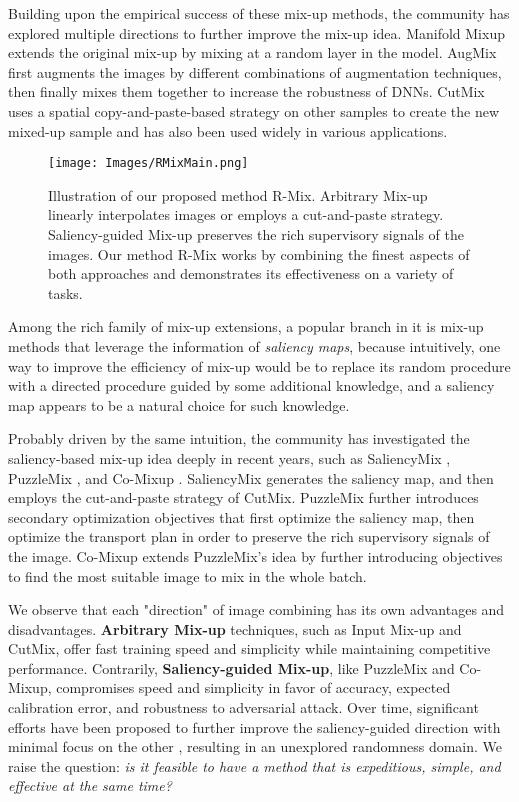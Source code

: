 \documentclass[letterpaper]{article} \usepackage[submission]{aaai23}  \usepackage{times}  \usepackage{helvet}  \usepackage{courier}  \usepackage[hyphens]{url}  \usepackage{graphicx} \urlstyle{rm} \def\UrlFont{\rm}  \usepackage{natbib}  \usepackage{caption} \frenchspacing  \setlength{\pdfpagewidth}{8.5in} \setlength{\pdfpageheight}{11in}
\newcommand{\cutmix}{{CutMix}}
\newcommand{\puzzlemix}{{PuzzleMix}}
\newcommand{\comixup}{{Co-Mixup}}
\newcommand{\manifoldmixup}{{Manifold Mixup}}
\newcommand{\saliencymix}{{SaliencyMix}}
\newcommand{\rrlmix}{{R-Mix}}
\begin{document}
Building upon the empirical success of these mix-up methods, 
the community has explored multiple directions to further 
improve the mix-up idea. \manifoldmixup{} \cite{verma2019manifold} extends the original mix-up by mixing at a random layer in the model. {AugMix} \cite{hendrycks*2020augmix} first augments the images by different combinations of augmentation techniques, then finally mixes them together to increase the robustness of DNNs. 
\cutmix{} \cite{yun2019cutmix} uses a spatial copy-and-paste-based strategy on other samples to create the new mixed-up sample
and has also been used widely in various applications.

\begin{figure}[t]
  \centering
  \texttt{[image: Images/RMixMain.png]}
  \caption{Illustration of our proposed method \rrlmix{}. Arbitrary Mix-up linearly interpolates images or employs a cut-and-paste strategy. Saliency-guided Mix-up preserves the rich supervisory signals of the images. Our method \rrlmix{} works by combining the finest aspects of both approaches and demonstrates its effectiveness on a variety of tasks.}
  \label{fig:overview}
\end{figure}

Among the rich family of mix-up extensions, 
a popular branch in it is mix-up methods 
that leverage the information of \emph{saliency maps}, 
because intuitively, 
one way to improve the efficiency of mix-up would be to replace its random procedure with a directed procedure guided by some additional knowledge, 
and a saliency map appears to be a natural choice for such knowledge. 

Probably driven by the same intuition, 
the community has investigated the saliency-based mix-up idea deeply 
in recent years,
such as \saliencymix{} \cite{uddin2021saliencymix}, \puzzlemix{} \cite{kim2020puzzlemix}, and \comixup{} \cite{kim2021comixup}. \saliencymix{}  generates the saliency map, and then employs the cut-and-paste strategy of \cutmix{}. \puzzlemix{} further introduces secondary optimization objectives that first optimize the saliency map, then optimize the transport plan in order to preserve the rich supervisory signals of the image. \comixup{} extends \puzzlemix{}'s idea by further introducing objectives to find the most suitable image to mix in the whole batch. 

We observe that each "direction" of image combining has its own advantages and disadvantages. \textbf{Arbitrary Mix-up} techniques, such as Input Mix-up and CutMix, offer fast training speed and simplicity while maintaining competitive performance. Contrarily, \textbf{Saliency-guided Mix-up}, like PuzzleMix and Co-Mixup, compromises speed and simplicity in favor of accuracy, expected calibration error, and robustness to adversarial attack. Over time, significant efforts have been proposed to further improve the saliency-guided direction with minimal focus on the other \cite{uddin2021saliencymix, kim2020puzzlemix, kim2021comixup, mixup9}, resulting in an unexplored randomness domain. We raise the question: \emph{is it feasible to have a method that is expeditious, simple, and effective at the same time?}
\end{document}

